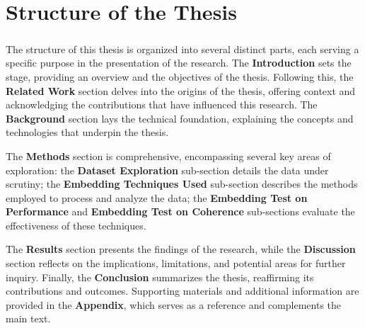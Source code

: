 \chapter{Structure of the Thesis}

\paragraph{}The structure of this thesis is organized into several distinct parts, each serving a specific purpose in the presentation of the research. The \textbf{Introduction} sets the stage, providing an overview and the objectives of the thesis. Following this, the \textbf{Related Work} section delves into the origins of the thesis, offering context and acknowledging the contributions that have influenced this research. The \textbf{Background} section lays the technical foundation, explaining the concepts and technologies that underpin the thesis.

The \textbf{Methods} section is comprehensive, encompassing several key areas of exploration: the \textbf{Dataset Exploration} sub-section details the data under scrutiny; the \textbf{Embedding Techniques Used} sub-section describes the methods employed to process and analyze the data; the \textbf{Embedding Test on Performance} and \textbf{Embedding Test on Coherence} sub-sections evaluate the effectiveness of these techniques.

The \textbf{Results} section presents the findings of the research, while the \textbf{Discussion} section reflects on the implications, limitations, and potential areas for further inquiry. Finally, the \textbf{Conclusion} summarizes the thesis, reaffirming its contributions and outcomes. Supporting materials and additional information are provided in the \textbf{Appendix}, which serves as a reference and complements the main text.

